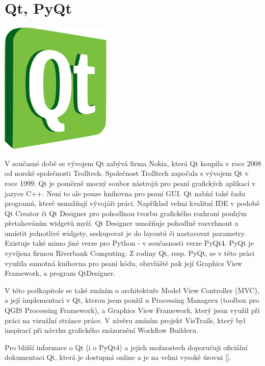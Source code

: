 \newpage
\section{Qt, PyQt}
\nocite{pyqt:www}

\begin{center}
	\includegraphics[scale=0.3]{pictures/qt_logo}
\end{center}

V současné době se vývojem Qt zabývá firma Nokia, která Qt koupila v roce 2008 od norské společnosti Trolltech. Společnost Trolltech započala s vývojem Qt v roce 1999. Qt je poměrně mocný soubor nástrojů pro psaní grafických aplikací v jazyce C++. Není to ale pouze knihovna pro psaní GUI. Qt nabízí také řadu programů, které usnadňují vývojáři práci. Například velmi kvalitní IDE v podobě Qt Creator či Qt Designer pro pohodlnou tvorbu grafického rozhraní pouhým přetahováním widgetů myší. Qt Designer umožňuje pohodlně rozvrhnout a umístit jednotlivé widgety, seskupovat je do layoutů či nastavovat parametry. \\
\indent Existuje také mimo jiné verze pro Python - v současnosti verze PyQt4. PyQt je vyvíjena firmou Riverbank Computing. Z rodiny Qt, resp. PyQt, se v této práci využila samotná knihovna pro psaní kódu, obzvláště pak její Graphics View Framework, a program QtDesigner.

V této podkapitole se také zmíním o architektuře Model View Controller (MVC), a její implementaci v Qt, kterou jsem použil u Processing Manageru (toolbox pro QGIS Processing Framework), a Graphics View Framework, který jsem využil při práci na vizuální stránce práce. V závěru zmíním projekt VisTrails, který byl inspirací při návrhu grafického znázornění Workflow Builderu. 

Pro bližší informace o Qt (i o PyQt4) a jejich možnostech doporučuji oficiální dokumentaci Qt, která je dostupná online a je na velmi vysoké úrovni [\cite{qt:www}].

